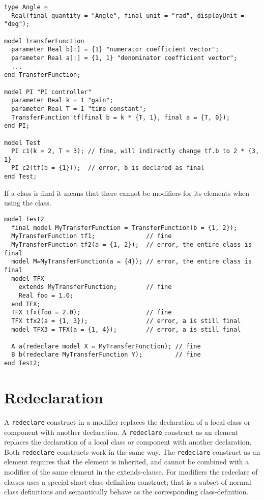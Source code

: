 \begin{example}
\begin{lstlisting}[language=modelica]
type Angle =
  Real(final quantity = "Angle", final unit = "rad", displayUnit = "deg");

model TransferFunction
  parameter Real b[:] = {1} "numerator coefficient vector";
  parameter Real a[:] = {1, 1} "denominator coefficient vector";
  ...
end TransferFunction;

model PI "PI controller"
  parameter Real k = 1 "gain";
  parameter Real T = 1 "time constant";
  TransferFunction tf(final b = k * {T, 1}, final a = {T, 0});
end PI;

model Test
  PI c1(k = 2, T = 3); // fine, will indirectly change tf.b to 2 * {3, 1}
  PI c2(tf(b = {1}));  // error, b is declared as final
end Test;
\end{lstlisting}
\end{example}
If a class is final it means that there cannot be modifiers for its elements when using the class.
\begin{example}
\begin{lstlisting}[language=modelica]
model Test2
  final model MyTransferFunction = TransferFunction(b = {1, 2});
  MyTransferFunction tf1;              // fine
  MyTransferFunction tf2(a = {1, 2});  // error, the entire class is final
  model M=MyTransferFunction(a = {4}); // error, the entire class is final
  model TFX
    extends MyTransferFunction;        // fine
    Real foo = 1.0;
  end TFX;
  TFX tfx(foo = 2.0);                  // fine
  TFX tfx2(a = {1, 3});                // error, a is still final
  model TFX3 = TFX(a = {1, 4});        // error, a is still final

  A a(redeclare model X = MyTransferFunction); // fine
  B b(redeclare MyTransferFunction Y);         // fine
end Test2;

\end{lstlisting}
\end{example}

\section{Redeclaration}\label{redeclaration}

A \lstinline!redeclare! construct in a modifier replaces the declaration of a local class or component with another declaration.  A \lstinline!redeclare! construct as an element replaces the declaration of a local class or component with another declaration.  Both \lstinline!redeclare! constructs work in the same way.  The \lstinline!redeclare! construct as an element requires that the element is inherited, and cannot be combined with a modifier of the same element in the extends-clause.  For modifiers the redeclare of classes uses a special short-class-definition construct; that is a subset of normal class definitions and semantically behave as the corresponding class-definition.

